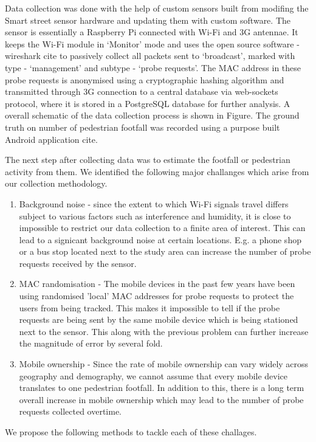 Data collection was done with the help of custom sensors built from modifing the Smart street sensor \citep{sss2016} hardware and updating them with custom software.
The sensor is essentially a Raspberry Pi connected with Wi-Fi and 3G antennae.
It keeps the Wi-Fi module in `Monitor' mode and uses the open source software - wireshark cite to passively collect all packets sent to `broadcast', marked with type - `management' and subtype - `probe requests'.
The MAC address in these probe requests is anonymised using a cryptographic hashing algorithm and transmitted through 3G connection to a central database via web-sockets protocol, where it is stored in a PostgreSQL database for further analysis.
A overall schematic of the data collection process is shown in Figure.
The ground truth on number of pedestrian footfall was recorded using a purpose built Android application cite. 

The next step after collecting data was to estimate the footfall or pedestrian activity from them. We identified the following major challanges which arise from our collection methodology.
\begin{enumerate}
	\item Background noise - since the extent to which Wi-Fi signals travel differs subject to various factors such as interference and humidity, it is close to impossible to restrict our data collection to a finite area of interest. This can lead to a signicant background noise at certain locations. E.g. a phone shop or a bus stop located next to the study area can increase the number of probe requests received by the sensor.
	\item MAC randomisation - The mobile devices in the past few years have been using randomised 'local' MAC addresses for probe requests to protect the users from being tracked. This makes it impossible to tell if the probe requests are being sent by the same mobile device which is being stationed next to the sensor. This along with the previous problem can further increase the magnitude of error by several fold.
	\item Mobile ownership - Since the rate of mobile ownership can vary widely across geography and demography, we cannot assume that every mobile device translates to one pedestrian footfall. In addition to this, there is a long term overall increase in mobile ownership which may lead to the number of probe requests collected overtime. 
\end{enumerate}
We propose the following methods to tackle each of these challages.

